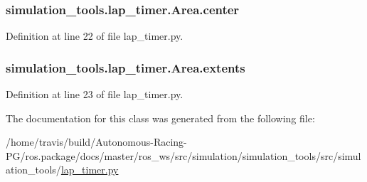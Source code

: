 \subsubsection[{\texorpdfstring{center}{center}}]{\setlength{\rightskip}{0pt plus 5cm}simulation\+\_\+tools.\+lap\+\_\+timer.\+Area.\+center}\hypertarget{classsimulation__tools_1_1lap__timer_1_1_area_ab6d54ce6f15f7931e2c97c418ef275ec}{}\label{classsimulation__tools_1_1lap__timer_1_1_area_ab6d54ce6f15f7931e2c97c418ef275ec}


Definition at line 22 of file lap\+\_\+timer.\+py.

\subsubsection[{\texorpdfstring{extents}{extents}}]{\setlength{\rightskip}{0pt plus 5cm}simulation\+\_\+tools.\+lap\+\_\+timer.\+Area.\+extents}\hypertarget{classsimulation__tools_1_1lap__timer_1_1_area_a5a876b3d7c79ddb803e0e66d851c8c4d}{}\label{classsimulation__tools_1_1lap__timer_1_1_area_a5a876b3d7c79ddb803e0e66d851c8c4d}


Definition at line 23 of file lap\+\_\+timer.\+py.



The documentation for this class was generated from the following file\+:\begin{DoxyCompactItemize}
\item 
/home/travis/build/\+Autonomous-\/\+Racing-\/\+P\+G/ros.\+package/docs/master/ros\+\_\+ws/src/simulation/simulation\+\_\+tools/src/simulation\+\_\+tools/\hyperlink{lap__timer_8py}{lap\+\_\+timer.\+py}\end{DoxyCompactItemize}
